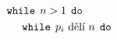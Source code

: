 \documentclass[preview]{standalone}
\begin{document}
\begin{align*}
\mathtt{while} & \:\: n > 1 \:\:  \mathtt{do}  \\&\hspace*{-12pt} \mathtt{while}  \:\: p_i \text{ dělí } n \:\:  \mathtt{do}
\end{align*}
\end{document}
